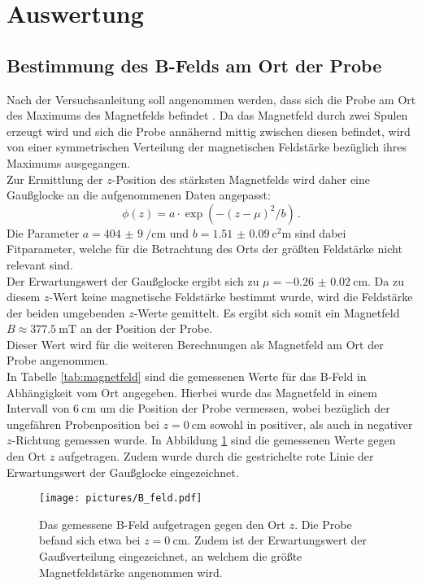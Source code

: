 \section{Auswertung}
\label{sec:Auswertung}
%
\subsection{Bestimmung des B-Felds am Ort der Probe}
Nach der Versuchsanleitung soll angenommen werden, dass sich die Probe am Ort des Maximums des Magnetfelds befindet \cite{Anleitung}.
Da das Magnetfeld durch zwei Spulen erzeugt wird und sich die Probe annähernd mittig zwischen diesen befindet, wird von einer symmetrischen Verteilung der magnetischen Feldstärke bezüglich ihres Maximums ausgegangen.\\ Zur Ermittlung der $z$-Position des stärksten Magnetfelds wird daher eine Gaußglocke an die aufgenommenen Daten angepasst:
\begin{equation}
	\phi(z)=a\cdot\exp\left({-(z-\mu)^2/b}\right) \, \mathrm{.}
\end{equation}
Die Parameter $a=\SI{404(9)}{\per\centi\meter}$  und $b=\SI{1.51(9)}{\square\centi\meter}$ sind dabei Fitparameter, welche für die Betrachtung des Orts der größten Feldstärke nicht relevant sind.\\
Der Erwartungswert der Gaußglocke ergibt sich zu $\mu=\SI{-0.26(2)}{\centi\meter}$. Da zu diesem $z$-Wert keine magnetische Feldstärke bestimmt wurde, wird die Feldstärke der beiden umgebenden $z$-Werte gemittelt.
Es ergibt sich somit ein Magnetfeld $B\approx \SI{377.5}{\milli\tesla}$ an der Position der Probe.\\
Dieser Wert wird für die weiteren Berechnungen als Magnetfeld am Ort der Probe angenommen.\\
In Tabelle \ref{tab:magnetfeld} sind die gemessenen Werte für das B-Feld in Abhängigkeit vom Ort angegeben. Hierbei wurde das Magnetfeld in einem Intervall von $\SI{6}{\centi\meter}$ um die Position der Probe vermessen, wobei bezüglich der ungefähren Probenposition bei $z=\SI{0}{\centi\meter}$ sowohl in positiver, als auch in negativer $z$-Richtung gemessen wurde. In Abbildung \ref{fig:magnetfeld} sind die gemessenen Werte gegen den Ort $z$ aufgetragen. Zudem wurde durch die gestrichelte rote Linie der Erwartungswert der Gaußglocke eingezeichnet.
\begin{figure}
  \centering
  \texttt{[image: pictures/B\_feld.pdf]}
  \caption{Das gemessene B-Feld aufgetragen gegen den Ort $z$. Die Probe befand sich etwa bei $z=\SI{0}{\centi\meter}$. Zudem ist der Erwartungswert der Gaußverteilung eingezeichnet, an welchem die größte Magnetfeldstärke angenommen wird.}
  \label{fig:magnetfeld}
\end{figure}
